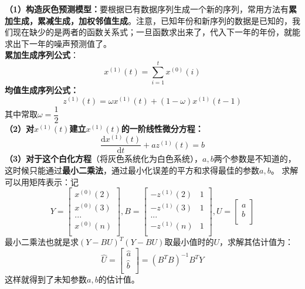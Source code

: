 \documentclass[11pt,a4paper]{article}
\begin{document}
\noindent\textbf{（1）构造灰色预测模型：}要根据已有数据序列生成一个新的序列，常用方法有\textbf{累加生成，累减生成，加权邻值生成}。注意，已知年份和新序列的数据是已知的，我们现在缺少的是两者的函数关系式；一旦函数求出来了，代入下一年的年份，就能求出下一年的噪声预测值了。\\
\textbf{累加生成序列公式}：
\begin{equation*}
	x^{(1)}(t)=\sum_{i=1}^{t}x^{(0)}(i)
\end{equation*}
\noindent \textbf{均值生成序列公式：}
\begin{equation*}
	z^{(1)}(t)=\omega x^{(1)}(t)+(1-\omega )x^{(1)}(t-1)
\end{equation*}
其中常取$\omega=\dfrac{1}{2}$\\
\textbf{（2）对$x^{(1)}(t)$建立$x^{(1)}(t)$的一阶线性微分方程：}
\begin{equation*}
	\dfrac{\mathrm{d}x^{(1)}(t)}{\mathrm{d}t}+az^{(1)}(t)=b
\end{equation*}
\textbf{（3）对于这个白化方程}（将灰色系统化为白色系统），$a,b$两个参数是不知道的，这时候只能通过\textbf{最小二乘法}，通过最小化误差的平方和求得最佳的参数$a,b$。
求解可以用矩阵表示：记
\begin{equation*}
	Y=\begin{bmatrix}
		x^{(0)}(2)\\
		x^{(0)}(3)\\
		...\\
		x^{(0)}(n)\\
	\end{bmatrix},
	B=\begin{bmatrix}
		-z^{(1)}(2) & 1\\
		-z^{(1)}(3) & 1\\
		...\\
		-z^{(1)}(n) & 1\\
	\end{bmatrix},U=
\begin{bmatrix}
	a\\
	b\\
\end{bmatrix}
\end{equation*}
最小二乘法也就是求$(Y-BU)^T(Y-BU)$取最小值时的$U$，求解其估计值为：
\begin{equation*}
	\hat U= \begin{bmatrix}
		\hat a \\
		\hat b \\
	\end{bmatrix}=(B^TB)^{-1}B^TY
\end{equation*}
这样就得到了未知参数$a,b$的估计值。\\
\end{document}
